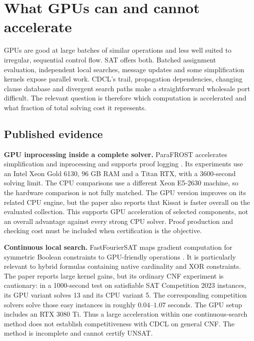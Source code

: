 \section{What GPUs can and cannot accelerate}
\label{sec:gpu}

GPUs are good at large batches of similar operations and less well suited to
irregular, sequential control flow. SAT offers both. Batched assignment
evaluation, independent local searches, message updates and some simplification
kernels expose parallel work. CDCL's trail, propagation dependencies, changing
clause database and divergent search paths make a straightforward wholesale
port difficult. The relevant question is therefore which computation is
accelerated and what fraction of total solving cost it represents.

\subsection{Published evidence}
\textbf{GPU inprocessing inside a complete solver.}
ParaFROST accelerates simplification and inprocessing and supports proof
logging \citep{osama2024}. Its experiments use an Intel Xeon Gold 6130,
96 GB RAM and a Titan RTX, with a 3600-second solving limit.
The CPU comparisons use a different Xeon E5-2630 machine, so the hardware
comparison is not fully matched.
The GPU version improves on its related CPU engine, but the paper also
reports that Kissat is faster overall on the evaluated collection.
This supports GPU acceleration of selected components, not an overall
advantage against every strong CPU solver. Proof production and checking
cost must be included when certification is the objective.

\textbf{Continuous local search.}
FastFourierSAT maps gradient computation for symmetric Boolean constraints
to GPU-friendly operations \citep{cen2025}. It is particularly relevant to
hybrid formulas containing native cardinality and XOR constraints.
The paper reports large kernel gains, but its ordinary CNF experiment is
cautionary: in a 1000-second test on satisfiable SAT Competition 2023
instances, its GPU variant solves 13 and its CPU variant 5. The corresponding
competition solvers solve those easy instances in roughly $0.04$--$1.07$
seconds. The GPU setup includes an RTX 3080 Ti. Thus a large acceleration
within one continuous-search method does not establish competitiveness with
CDCL on general CNF. The method is incomplete and cannot certify UNSAT.

